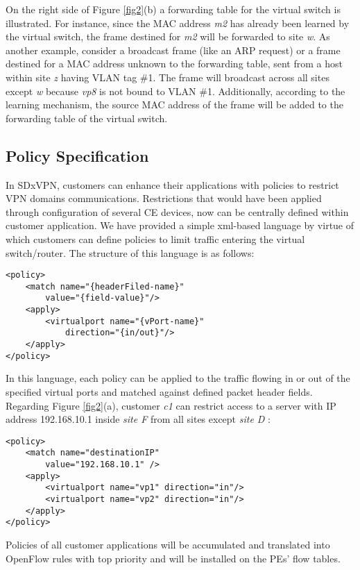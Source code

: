 \documentclass[10pt,conference]{IEEEtran}
\begin{document}
On the right side of Figure \ref {fig2}(b) a forwarding table for the virtual switch is illustrated. For instance, since the MAC address \textit{m2} has already been learned by the virtual switch, the frame destined for \textit{m2} will be forwarded to site \textit{w}. As another example, consider a broadcast frame (like an ARP request) or a frame destined for a MAC address unknown to the forwarding table, sent from a host within site \textit{z} having VLAN tag \#1. The frame will broadcast across all sites except \textit{w} because \textit{vp8} is not bound to VLAN \#1. Additionally, according to the learning mechanism, the source MAC address of the frame will be added to the forwarding table of the virtual switch. 

\subsection{Policy Specification}

In SDxVPN, customers can enhance their applications with policies to restrict VPN domains communications. Restrictions that would have been applied through configuration of several CE devices, now can be centrally defined within customer application. We have provided a simple xml-based language  by virtue of which customers can define policies to limit traffic entering the virtual switch/router. The structure of this language is as follows:

\begin{lstlisting}
<policy>
	<match name="{headerFiled-name}" 
		value="{field-value}"/>
	<apply>
		<virtualport name="{vPort-name}"  
			direction="{in/out}"/>
	</apply>
</policy>
\end{lstlisting}

In this language, each policy can be  applied to the traffic flowing in or out of the specified virtual ports and matched against defined packet header fields. Regarding Figure \ref{fig2}(a), customer \textit{c1} can restrict access to  a server with IP address 192.168.10.1 inside \textit{site F} from all sites except \textit{site D} :
\begin{lstlisting}
<policy>
	<match name="destinationIP" 
		value="192.168.10.1" />
	<apply>
		<virtualport name="vp1" direction="in"/>
		<virtualport name="vp2" direction="in"/>
	</apply>
</policy>
\end{lstlisting}

Policies of all customer applications will be accumulated and translated into OpenFlow rules with top priority and will be installed on the PEs' flow tables. 
\end{document}
